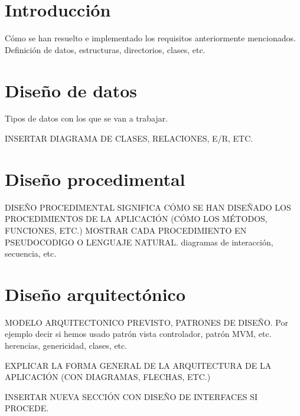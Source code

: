 
\section{Introducción}

Cómo se han resuelto e implementado los requisitos anteriormente mencionados. Definición de datos, estructuras, directorios, clases, etc.

\section{Diseño de datos}

Tipos de datos con los que se van a trabajar.

INSERTAR DIAGRAMA DE CLASES, RELACIONES, E/R, ETC.

\section{Diseño procedimental}

DISEÑO PROCEDIMENTAL SIGNIFICA CÓMO SE HAN DISEÑADO LOS PROCEDIMIENTOS DE LA APLICACIÓN (CÓMO LOS MÉTODOS, FUNCIONES, ETC.)
MOSTRAR CADA PROCEDIMIENTO EN PSEUDOCODIGO O LENGUAJE NATURAL.
diagramas de interacción, secuencia, etc.

\section{Diseño arquitectónico}

MODELO ARQUITECTONICO PREVISTO, PATRONES DE DISEÑO. Por ejemplo decir si hemos usado patrón vista controlador, patrón MVM, etc.
herencias, genericidad, clases, etc.

EXPLICAR LA FORMA GENERAL DE LA ARQUITECTURA DE LA APLICACIÓN (CON DIAGRAMAS, FLECHAS, ETC.)

INSERTAR NUEVA SECCIÓN CON DISEÑO DE INTERFACES SI PROCEDE.